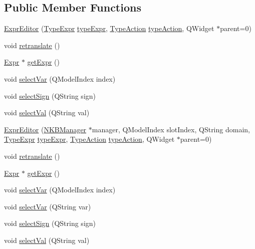 \subsection*{Public Member Functions}
\begin{DoxyCompactItemize}
\item 
\hyperlink{class_expr_editor_a0419ad05b21b60dc52a7773a66772b99}{ExprEditor} (\hyperlink{class_expr_editor_a40396ae5bf9765a688e0ea69ab0e64ad}{TypeExpr} \hyperlink{class_expr_editor_a1c7b9320a532938c395d2397a09169f3}{typeExpr}, \hyperlink{class_expr_editor_a1705d866529cb7d8867be3964d778ae8}{TypeAction} \hyperlink{class_expr_editor_a21311ad2ed99205ae664fcc9e975aae3}{typeAction}, QWidget $\ast$parent=0)
\item 
void \hyperlink{class_expr_editor_a3915291eb02e7eb5204a2f07626c5b69}{retranslate} ()
\item 
\hyperlink{class_expr}{Expr} $\ast$ \hyperlink{class_expr_editor_a2ddaedfa02379f15cebaca685b35c5cc}{getExpr} ()
\item 
void \hyperlink{class_expr_editor_ab032a7dc4fae43ab58efde49668213ab}{selectVar} (QModelIndex index)
\item 
void \hyperlink{class_expr_editor_a1958f9085ed67eb8a810c5a5e29fafcc}{selectSign} (QString sign)
\item 
void \hyperlink{class_expr_editor_af0eea4ef9f1cc6979c6ddbcd12b8a23d}{selectVal} (QString val)
\item 
\hyperlink{class_expr_editor_a3757fe631cab871c36ee40f028bc8f21}{ExprEditor} (\hyperlink{class_n_k_b_manager}{NKBManager} $\ast$manager, QModelIndex slotIndex, QString domain, \hyperlink{class_expr_editor_a40396ae5bf9765a688e0ea69ab0e64ad}{TypeExpr} \hyperlink{class_expr_editor_a1c7b9320a532938c395d2397a09169f3}{typeExpr}, \hyperlink{class_expr_editor_a1705d866529cb7d8867be3964d778ae8}{TypeAction} \hyperlink{class_expr_editor_a21311ad2ed99205ae664fcc9e975aae3}{typeAction}, QWidget $\ast$parent=0)
\item 
void \hyperlink{class_expr_editor_a3915291eb02e7eb5204a2f07626c5b69}{retranslate} ()
\item 
\hyperlink{class_expr}{Expr} $\ast$ \hyperlink{class_expr_editor_a868afd2650e2162833ccc0d517e03c31}{getExpr} ()
\item 
void \hyperlink{class_expr_editor_ab032a7dc4fae43ab58efde49668213ab}{selectVar} (QModelIndex index)
\item 
void \hyperlink{class_expr_editor_a50aac6d62bb0d5bea6ee6913de5b7304}{selectVar} (QString var)
\item 
void \hyperlink{class_expr_editor_a1958f9085ed67eb8a810c5a5e29fafcc}{selectSign} (QString sign)
\item 
void \hyperlink{class_expr_editor_af0eea4ef9f1cc6979c6ddbcd12b8a23d}{selectVal} (QString val)
\end{DoxyCompactItemize}
